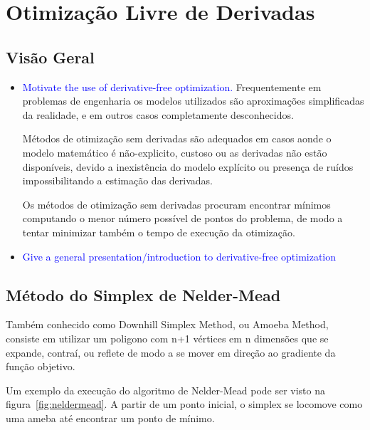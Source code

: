 \chapter{Otimização Livre de Derivadas} \label{chap:3}


\section{Visão Geral}

\begin{itemize}


\item \textcolor{blue}{Motivate the use of derivative-free optimization.}
Frequentemente em problemas de engenharia os modelos utilizados são aproximações simplificadas da realidade, e em outros casos completamente desconhecidos.

Métodos de otimização sem derivadas são adequados em casos aonde o modelo matemático é não-explicito, custoso ou as derivadas não estão disponíveis, devido a inexistência do modelo explícito ou presença de ruídos impossibilitando a estimação das derivadas.

Os métodos de otimização sem derivadas procuram encontrar mínimos computando o menor número possível de pontos do problema, de modo a tentar minimizar também o tempo de execução da otimização.



\item \textcolor{blue}{Give a general presentation/introduction to derivative-free optimization}

\end{itemize}


\section{Método do Simplex de Nelder-Mead}

Também conhecido como Downhill Simplex Method, ou Amoeba Method, consiste em utilizar um poligono com n+1 vértices em n dimensões que se expande, contraí, ou reflete de modo a se mover em direção ao gradiente da função objetivo.

Um exemplo da execução do algoritmo de Nelder-Mead pode ser visto na figura~\ref{fig:neldermead}. A partir de um ponto inicial, o simplex se locomove como uma ameba até encontrar um ponto de mínimo.

